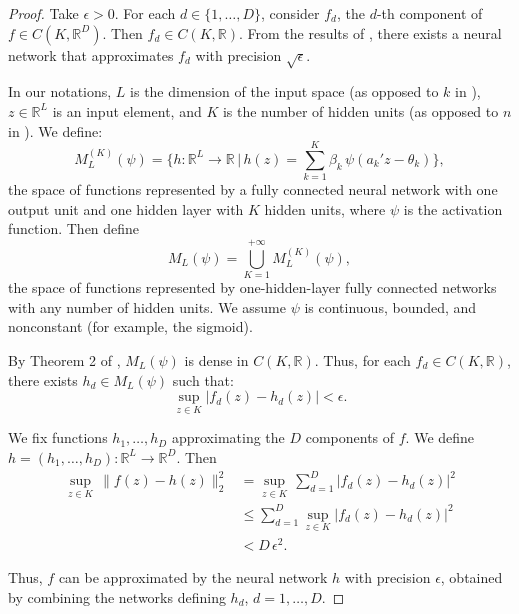 \documentclass{article}
\begin{document}
\begin{proof}
Take $\epsilon > 0$. For each $d \in \{1,\dots,D\}$, consider $f_d$, the $d$-th component of $f \in C(K,\mathbb{R}^D)$. Then $f_d \in C(K,\mathbb{R})$. From the results of \cite{hornik1991approximation}, there exists a neural network that approximates $f_d$ with precision $\sqrt\epsilon$.

In our notations, $L$ is the dimension of the input space (as opposed to $k$ in \cite{hornik1991approximation}), $z \in \mathbb{R}^L$ is an input element, and $K$ is the number of hidden units (as opposed to $n$ in \cite{hornik1991approximation}). We define:
\[
M^{(K)}_L(\psi) = \Big\{ h : \mathbb{R}^L \to \mathbb{R} \,\big|\,
h(z) = \sum_{k=1}^K \beta_k \, \psi(a_k'z - \theta_k) \Big\},
\]
the space of functions represented by a fully connected neural network with one output unit and one hidden layer with $K$ hidden units, where $\psi$ is the activation function. Then define
\[
M_L(\psi) = \bigcup_{K=1}^{+\infty} M^{(K)}_L(\psi),
\]
the space of functions represented by one-hidden-layer fully connected networks with any number of hidden units. We assume $\psi$ is continuous, bounded, and nonconstant (for example, the sigmoid).

By Theorem 2 of \cite{hornik1991approximation}, $M_L(\psi)$ is dense in $C(K,\mathbb{R})$. Thus, for each $f_d \in C(K,\mathbb{R})$, there exists $h_d \in M_L(\psi)$ such that:
\[
\sup_{z \in K} |f_d(z) - h_d(z)| < \epsilon.
\]

We fix functions $h_1,\dots,h_D$ approximating the $D$ components of $f$. We define $h = (h_1,\dots,h_D) : \mathbb{R}^L \to \mathbb{R}^D$. Then
\begin{align*}
\sup_{z\in K}\,\| f(z) - h(z) \|_2^2
&= \sup_{z\in K}\,\sum_{d=1}^D |f_d(z) - h_d(z)|^2\\
&\le \sum_{d=1}^D \sup_{z\in K} |f_d(z) - h_d(z)|^2\\
&< D\,\epsilon^2.
\end{align*}


Thus, $f$ can be approximated by the neural network $h$ with precision $\epsilon$, obtained by combining the networks defining $h_d$, $d=1,\dots,D$.
\end{proof}
\end{document}
